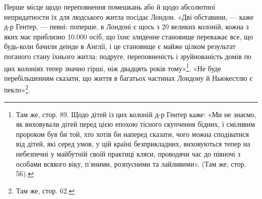 Перше місце щодо переповнення помешкань або й щодо абсолютної
непридатности їх для людського житла посідає Лондон.
«Дві обставини, — каже д-р Гентер, — певні: поперше, в Лондоні
є щось з 20 великих колоній, кожна з яких має приблизно
\num{10.000}  осіб, що їхнє злиденне становище переважає все, що будь-коли
бачили деінде в Англії, і це становище є майже цілком результат
поганого стану їхнього житла; подруге, переповненість і зруйнованість
домів по цих колоніях тепер значно гірші, ніж двадцять
років тому»\footnote{
Там же, стор. 89. Щодо дітей із цих колоній д-р Гентер каже:
«Ми не знаємо, як виховували дітей перед цією епохою тісного скупчення
бідних, і сміливим пророком був би той, хто хотів би наперед сказати,
чого можна сподіватися від дітей, які серед умов, у цій країні безприкладних,
виховуються тепер на небезпечні у майбутній своїй практиці кляси,
проводячи час до півночі з особами всякого віку, п'яними, розпусними та
лайливими». (Там же, стор. 56).
}. «Не буде перебільшенням сказати, що
життя в багатьох частинах Лондону й Ньюкестлю є пекло»\footnote{
Там же, стор. 62.
}.

